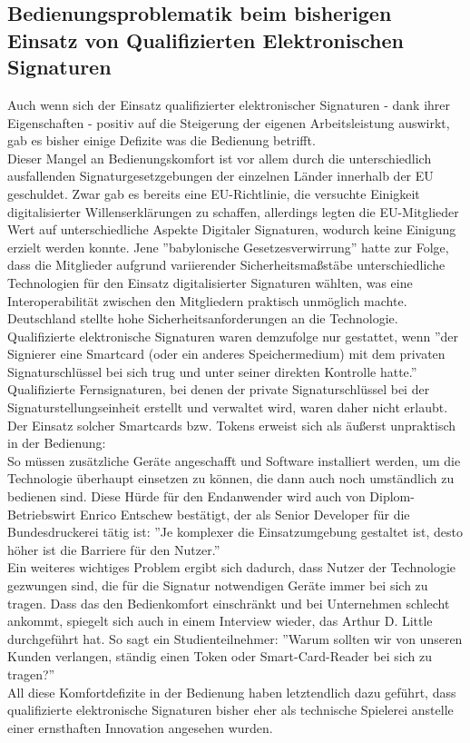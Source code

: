\documentclass[deutsch]{lib/llncs/llncs}
\begin{document}
\subsection{Bedienungsproblematik beim bisherigen Einsatz von Qualifizierten Elektronischen Signaturen}
Auch wenn sich der Einsatz qualifizierter elektronischer Signaturen - dank ihrer Eigenschaften - positiv auf die Steigerung der eigenen Arbeitsleistung auswirkt, gab es bisher einige Defizite was die Bedienung betrifft. \\
Dieser Mangel an Bedienungskomfort ist vor allem durch die unterschiedlich ausfallenden Signaturgesetzgebungen der einzelnen Länder innerhalb der EU geschuldet. Zwar gab es bereits eine EU-Richtlinie, die versuchte Einigkeit digitalisierter Willenserklärungen zu schaffen, allerdings legten die EU-Mitglieder Wert auf unterschiedliche Aspekte Digitaler Signaturen, wodurch keine Einigung erzielt werden konnte. \cite[S. 30]{Zitat08} Jene ''babylonische Gesetzesverwirrung'' \cite[S. 30]{Zitat08} hatte zur Folge, dass die Mitglieder aufgrund variierender Sicherheitsmaßstäbe unterschiedliche Technologien für den Einsatz digitalisierter Signaturen wählten, was eine Interoperabilität zwischen den Mitgliedern praktisch unmöglich machte. \\
Deutschland stellte hohe Sicherheitsanforderungen an die Technologie. Qualifizierte elektronische Signaturen waren demzufolge nur gestattet, wenn ''der Signierer eine Smartcard (oder ein anderes Speichermedium) mit dem privaten Signaturschlüssel bei sich trug und unter seiner direkten Kontrolle hatte.'' \cite[S. 30]{Zitat08} Qualifizierte Fernsignaturen, bei denen der private Signaturschlüssel bei der Signaturstellungseinheit erstellt und verwaltet wird, waren daher nicht erlaubt. \\
Der Einsatz solcher Smartcards bzw. Tokens erweist sich als äußerst unpraktisch in der Bedienung: \\
So müssen zusätzliche Geräte angeschafft und Software installiert werden, um die Technologie überhaupt einsetzen zu können, die dann auch noch umständlich zu bedienen sind. Diese Hürde für den Endanwender wird auch von Diplom-Betriebswirt Enrico Entschew bestätigt, der als Senior Developer für die Bundesdruckerei tätig ist: ''Je komplexer die Einsatzumgebung gestaltet ist, desto höher ist die Barriere für den Nutzer.'' \cite[S. 232]{Zitat09} \\
Ein weiteres wichtiges Problem ergibt sich dadurch, dass Nutzer der Technologie gezwungen sind, die für die Signatur notwendigen Geräte immer bei sich zu tragen. Dass das den Bedienkomfort einschränkt und bei Unternehmen schlecht ankommt, spiegelt sich auch in einem Interview wieder, das Arthur D. Little durchgeführt hat. So sagt ein Studienteilnehmer: ''Warum sollten wir von unseren Kunden verlangen, ständig einen Token oder Smart-Card-Reader bei sich zu tragen?'' \cite[S. 5]{Zitat05} \\
All diese Komfortdefizite in der Bedienung haben letztendlich dazu geführt, dass qualifizierte elektronische Signaturen bisher eher als technische Spielerei anstelle einer ernsthaften Innovation angesehen wurden.  \cite[S. 29]{Zitat08}
\end{document}
